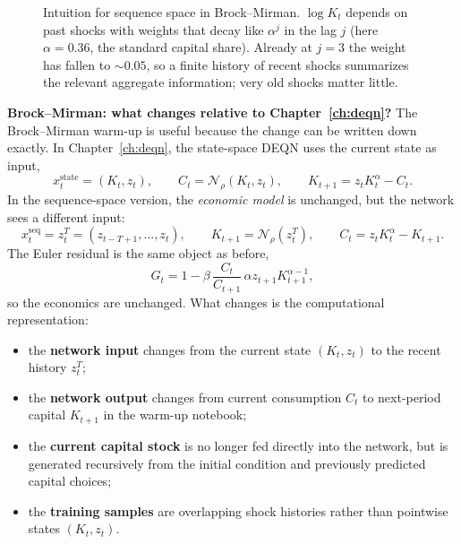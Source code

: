 \documentclass[11pt,a4paper]{report}
\begin{document}
\begin{figure}[ht]
\centering
{}
\caption{Intuition for sequence space in Brock--Mirman.  $\log K_t$ depends on past shocks with weights that decay like $\alpha^j$ in the lag $j$ (here $\alpha = 0.36$, the standard capital share).  Already at $j = 3$ the weight has fallen to $\sim\!0.05$, so a finite history of recent shocks summarizes the relevant aggregate information; very old shocks matter little.}
\label{fig:sequence_space_decay}
\end{figure}

\medskip\noindent\textbf{Brock--Mirman: what changes relative to Chapter~\ref{ch:deqn}?}
The Brock--Mirman warm-up is useful because the change can be written down exactly.  In Chapter~\ref{ch:deqn}, the state-space DEQN uses the current state as input,
\[
x_t^{\mathrm{state}} = (K_t, z_t), \qquad C_t = \mathcal{N}_\rho(K_t, z_t), \qquad K_{t+1} = z_t K_t^\alpha - C_t.
\]
In the sequence-space version, the \emph{economic model} is unchanged, but the network sees a different input:
\[
x_t^{\mathrm{seq}} = z_t^T = (z_{t-T+1}, \ldots, z_t), \qquad K_{t+1} = \mathcal{N}_\rho(z_t^T), \qquad C_t = z_t K_t^\alpha - K_{t+1}.
\]
The Euler residual is the same object as before,
\[
G_t = 1 - \beta \,\frac{C_t}{C_{t+1}} \,\alpha z_{t+1} K_{t+1}^{\alpha-1},
\]
so the economics are unchanged.  What changes is the computational representation:
\begin{itemize}[itemsep=2pt]
\item the \textbf{network input} changes from the current state $(K_t, z_t)$ to the recent history $z_t^T$;
\item the \textbf{network output} changes from current consumption $C_t$ to next-period capital $K_{t+1}$ in the warm-up notebook;
\item the \textbf{current capital stock} is no longer fed directly into the network, but is generated recursively from the initial condition and previously predicted capital choices;
\item the \textbf{training samples} are overlapping shock histories rather than pointwise states $(K_t, z_t)$.
\end{itemize}
\end{document}
